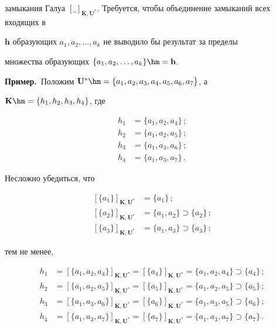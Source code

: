 замыкания Галуа $[\_]_{\mathbf{K},\mathbf{U}^*}$. Требуется, чтобы объединение замыканий всех входящих в 

$\mathbf{h}$ образующих $a_1, a_2, \ldots , a_k$ не выводило бы результат за пределы 

множества образующих $\{a_1, a_2, \ldots , a_k\} \hm= \mathbf{h}$.

     

     \medskip

     

     \noindent

     \textbf{Пример.}\ Положим $\mathbf{U}^* \hm= \{a_1, a_2, a_3, a_4, a_5, a_6, a_7\}$, а 

     $\mathbf{K}\hm = \{h_1, h_2, h_3, h_4\}$, где

     \begin{align*}

h_1 &= \{a_1, a_2, a_4\}\,;\\

h_2 &= \{a_1, a_2, a_5\}\,;\\

h_3 &= \{a_1, a_3, a_6\}\,;\\

h_4 &= \{a_1, a_3, a_7\}\,.

\end{align*}

Несложно убедиться, что

\begin{align*}

[\{a_1\}]_{\mathbf{K},\mathbf{U}^*}& = \{a_1\}\,;\\

[\{a_2\}]_{\mathbf{K},\mathbf{U}^*} & = \{a_1, a_2\} \supset\{a_2\}\,;\\

[\{a_3\}]_{\mathbf{K},\mathbf{U}^*}& = \{a_1, a_3\} \supset\{a_3\}\,;

\end{align*}

тем не менее,

\begin{align*}

h_1 &= [\{a_1, a_2, a_4\}]_{\mathbf{K},\mathbf{U}^*} = [\{a_4\}]_{\mathbf{K},\mathbf{U}^*} = \{a_1, a_2, a_4\}\supset \{a_4\}\,;\\

h_2 &= [\{a_1, a_2, a_5\}]_{\mathbf{K},\mathbf{U}^*} = [\{a_5\}]_{\mathbf{K},\mathbf{U}^*} = \{a_1, a_2, a_5\} \supset\{a_5\}\,;\\

h_3 &= [\{a_1, a_3, a_6\}]_{\mathbf{K},\mathbf{U}^*} = [\{a_6\}]_{\mathbf{K},\mathbf{U}^*} = \{a_1, a_3, a_5\} \supset\{a_6\}\,;\\

h_4 &= [\{a_1, a_3, a_7\}]_{\mathbf{K},\mathbf{U}^*} = [\{a_7\}]_{\mathbf{K},\mathbf{U}^*} = \{a_1, a_3, a_7\} \supset\{a_7\}\,.

\end{align*}



